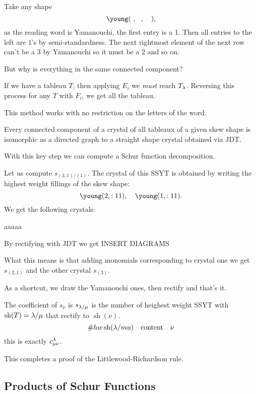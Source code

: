 \documentclass[12pt]{memoir}
\DeclareMathOperator{\sh}{sh}
\begin{document}
Take any shape 
$$\young(~,~~,~~~),$$
as the reading word is Yamanouchi, the first entry is a 1. Then all entries to the left are $1$'s by semi-standardness. The next rightmost element of the next row can't be a 3 by Yamanouchi so it must be a 2 and so on.\par 
But why is everything in the same connected component?\par 
If we have a tableau $T$, then applying $E_i$ we \emph{must} reach $T_\lambda$. Reversing this process for any $T$ with $F_i$, we get all the tableau. 

\begin{Rmk}
    This method works with no restriction on the letters of the word.
\end{Rmk}

\begin{Cor}
    Every connected component of a crystal of all tableaux of a given skew shape is isomorphic as a directed graph to a straight shape crystal obtained via JDT.
\end{Cor}

With this key step we can compute a Schur function decomposition.

\begin{Ex}
    Let us compute $s_{(3,1)/(1)}$. The crystal of this SSYT is obtained by writing the highest weight fillings of the skew shape:
    $$\young(2,:11),\quad\young(1,:11).$$
    We get the following crystals:
    \begin{center}
        aaaaa
    \end{center}
    By rectifying with JDT we get INSERT DIAGRAMS\par 
    What this means is that adding monomials corresponding to crystal one we get $s_{(2,1)}$ and the other crystal $s_{(3)}$.\par 
    As a shortcut, we draw the Yamanouchi ones, then rectify and that's it.
\end{Ex}

\begin{Cor}
    The coefficient of $s_\nu$ is $s_{\lambda/\mu}$ is the number of heighest weight SSYT with $\sh(T)=\la/\mu$ that rectify to $\sh(\nu)$. 
    $$\#hw\sh(\la/mu)\word{content}\nu$$
    this is exactly $c^\lambda_{\mu\nu}$.
\end{Cor}

This completes a proof of the Littlewood-Richardson rule. 

\subsection{Products of Schur Functions}
\end{document}
